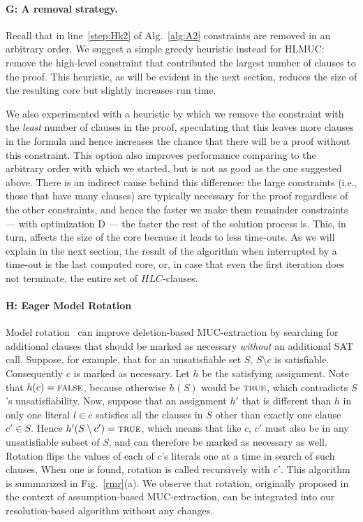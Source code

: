 \documentclass[twoside,11pt]{article}
\begin{document}
\paragraph{G: A removal strategy.}
Recall that in line~\ref{step:Hk2} of Alg.~\ref{alg:A2} constraints are
removed in an arbitrary order. We suggest a simple greedy heuristic instead
for HLMUC: remove the high-level constraint that contributed the largest
number of clauses to the proof. This heuristic, as will be evident in the
next section, reduces the size of the resulting core but slightly increases
run time.

We also experimented with a heuristic by which we remove the constraint with
the \emph{least} number of clauses in the proof, speculating that this leaves
more clauses in the formula and hence increases the chance that there will be
a proof without this constraint. This option also improves performance
comparing to the arbitrary order with which we started, but is not as good as
the one suggested above. There is an indirect cause behind this difference:
the large constraints (i.e., those that have many clauses) are typically
necessary for the proof regardless of the other constraints, and hence the
faster we make them remainder constraints --- with optimization  D --- the
faster the rest of the solution process is. This, in turn, affects the size
of the core because it leads to less time-outs. As we will explain in the
next section, the result of the algorithm when interrupted by a time-out is
the last computed core, or, in case that even the first iteration does not
terminate, the entire set of $HLC$-clauses.


\paragraph{H: Eager Model Rotation} \label{sec:emr}

Model rotation~\cite{SL11,BM11,DBLP:journals/aicom/BelovLM12} can improve
deletion-based MUC-extraction by searching for additional clauses that should
be marked as necessary \emph{without} an additional SAT call. Suppose, for
example, that for an unsatisfiable set $S$, $S \setminus c$ is satisfiable.
Consequently $c$ is marked as necessary. Let $h$ be the satisfying
assignment. Note that $h(c) = \mbox{{\sc false}}$, because otherwise $h(S)$ would be
$\mbox{{\sc true}}$, which contradicts $S$'s unsatisfiability. Now, suppose that an
assignment $h'$ that is different than $h$ in only one literal $l \in c$
satisfies all the clauses in $S$ other than exactly one clause $c' \in S$.
Hence $h'(S \setminus c') = \mbox{{\sc true}}$, which means that like $c$, $c'$ must also
be in any unsatisfiable subset of $S$, and can therefore be marked as
necessary as well. Rotation flips the values of each of $c$'s literals one at
a time in search of such clauses. When one is found, rotation is called
recursively with $c'$. This algorithm is summarized in Fig.~\ref{rmr}(a). We
observe that rotation, originally proposed in the context of assumption-based
MUC-extraction, can be integrated into our resolution-based algorithm without
any changes.
\end{document}
